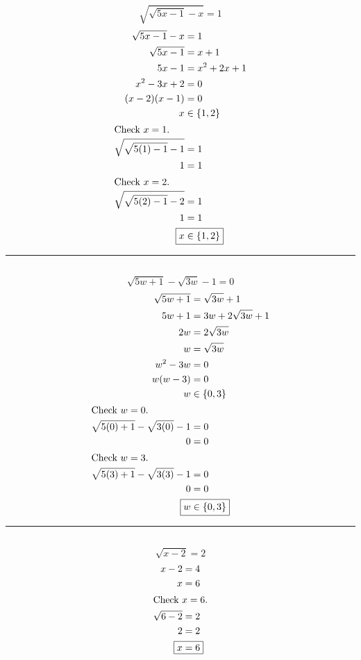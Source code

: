 	\subsection{}
		\[\sqrt{\sqrt{5x - 1} - x} = 1\]
		\begin{align*}
			\sqrt{5x - 1} - x &= 1 \\
			\sqrt{5x - 1} &= x + 1 \\
			5x - 1 &= x^2 + 2x + 1 \\
			x^2 - 3x + 2 &= 0 \\
			(x - 2)(x - 1) &= 0 \\
			x &\in \{1, 2\} \\
			\intertext{Check $x = 1$.}
			\sqrt{\sqrt{5(1) - 1} - 1} &= 1 \\
			1 &= 1 \\
			\intertext{Check $x = 2$.}
			\sqrt{\sqrt{5(2) - 1} - 2} &= 1 \\
			1 &= 1 \\
			\Aboxed{x &\in \{1, 2\}}
		\end{align*}
		\hrule{}

	\subsection{}
		\[\sqrt{5w + 1} - \sqrt{3w} - 1 = 0\]
		\begin{align*}
			\sqrt{5w + 1} &= \sqrt{3w} + 1 \\
			5w + 1 &= 3w + 2\sqrt{3w} + 1 \\
			2w &= 2\sqrt{3w} \\
			w &= \sqrt{3w} \\
			w^2 - 3w &= 0 \\
			w(w - 3) &= 0 \\
			w &\in \{0, 3\} \\
			\intertext{Check $w = 0$.}
			\sqrt{5(0) + 1} - \sqrt{3(0)} - 1 &= 0 \\
			0 &= 0 \\
			\intertext{Check $w = 3$.}
			\sqrt{5(3) + 1} - \sqrt{3(3)} - 1 &= 0 \\
			0 &= 0 \\
			\Aboxed{w &\in \{0, 3\}}
		\end{align*}
		\hrule{}

	\subsection{}
		\[\sqrt{x - 2} = 2\]
		\begin{align*}
			x - 2 &= 4 \\
			x &= 6 \\
			\intertext{Check $x = 6$.}
			\sqrt{6 - 2} &= 2 \\
			2 &= 2 \\
			\Aboxed{x &= 6}
		\end{align*}

